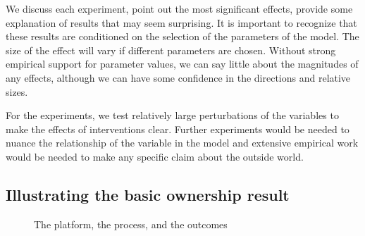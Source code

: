 We discuss each experiment, point out the most significant effects, provide some explanation of results that may seem surprising.  It is important to recognize that these results are conditioned on the selection of the parameters of the model. The size of the effect will vary if different parameters are chosen. %
Without strong empirical support for parameter values, we can say little about the magnitudes of any effects, although we can have some confidence in the directions and relative sizes. 

For the experiments, we test relatively large perturbations of the variables to make the effects of interventions clear. Further experiments would be needed to nuance the relationship of the variable in the model and extensive empirical work would be needed to make any specific claim about the outside world. 



\subsection*{Illustrating the basic ownership result}

\begin{figure}
\centering
{}
\caption{The platform, the process, and the outcomes}
\label{fig:outcomes}
\end{figure}

